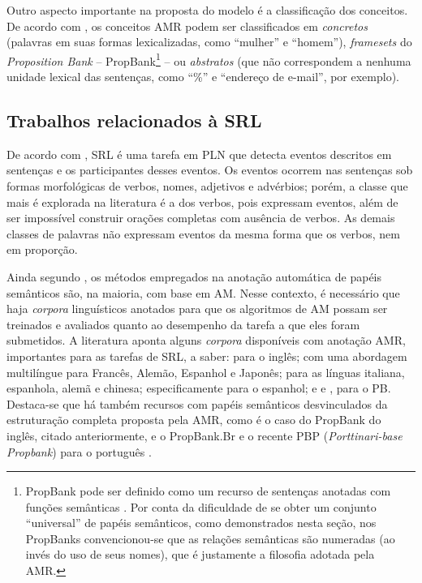 Outro aspecto importante na proposta do modelo é a classificação dos
conceitos. De acordo com \textcite{anchiêta2022}, os conceitos AMR podem
ser classificados em \emph{concretos} (palavras em suas formas
lexicalizadas, como ``mulher'' e ``homem''), \emph{framesets} do
\emph{Proposition Bank} -- PropBank\footnote{PropBank pode ser definido
  como um recurso de sentenças anotadas com funções semânticas
  \cite{jurafsky2023}. Por conta da dificuldade de se obter um
  conjunto ``universal'' de papéis semânticos, como demonstrados nesta
  seção, nos PropBanks convencionou-se que as relações semânticas são
  numeradas (ao invés do uso de seus nomes), que é justamente a
  filosofia adotada pela AMR.} -- \cite{palmer2005} ou
\emph{abstratos} (que não correspondem a nenhuma unidade lexical das sentenças, como ``\%'' e ``endereço de e-mail'', por exemplo).

\subsection{Trabalhos relacionados à SRL}\label{sub-sec-trabalhos}

De acordo com \textcite{hartmann2017}, SRL é uma tarefa em PLN
que detecta eventos descritos em sentenças e os participantes desses
eventos. Os eventos ocorrem nas sentenças sob formas morfológicas de
verbos, nomes, adjetivos e advérbios; porém, a classe que mais é
explorada na literatura é a dos verbos, pois expressam eventos, além de
ser impossível construir orações completas com ausência de verbos. As
demais classes de palavras não expressam eventos da mesma forma que os
verbos, nem em proporção.

Ainda segundo \textcite{hartmann2017}, os métodos empregados na
anotação automática de papéis semânticos são, na maioria, com base em
AM. Nesse contexto, é necessário que haja \emph{corpora} linguísticos
anotados para que os algoritmos de AM possam ser treinados e avaliados
quanto ao desempenho da tarefa a que eles foram submetidos. A literatura
aponta alguns \emph{corpora} disponíveis com anotação AMR, importantes
para as tarefas de SRL, a saber: \textcite{xue2014} para o inglês;
\textcite{vanderwende2015} com uma abordagem multilíngue para
Francês, Alemão, Espanhol e Japonês; \textcite{damonte2019} %
para as línguas italiana, espanhola, alemã e chinesa; \textcite{migueles2018} especificamente para o espanhol; e \textcite{anchiêta2018} e
\textcite{inacio2023}, para o PB. Destaca-se que há também
recursos com papéis semânticos desvinculados da estruturação completa
proposta pela AMR, como é o caso do PropBank do inglês, citado
anteriormente, e o PropBank.Br \cite{duran2012} e o recente PBP
(\emph{Porttinari-base Propbank}) para o português \cite{freitas2024}.

